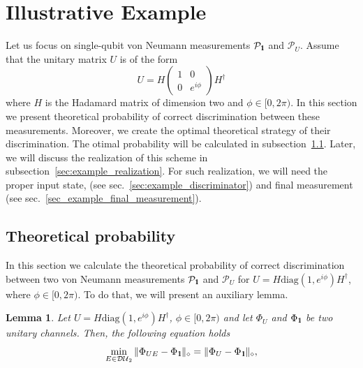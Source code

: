 \documentclass[preprint,12pt, a4paper]{elsarticle}
\newcommand{\1}{{\rm 1\hspace{-0.9mm}l}}
\newcommand{\Id}{{\rm 1\hspace{-0.9mm}l}}
\newcommand{\ee}{\ensuremath{\mathrm{e}}}
\newcommand{\ii}{\ensuremath{\mathrm{i}}}
\newcommand{\PP}{\mathcal{P}}
\newcommand{\diaguni}{\ensuremath{\mathcal{DU}}}
\newcommand{\diag}{\mathrm{diag}}
\newtheorem{lemma}{Lemma}
\begin{document}
\section{Illustrative Example}

Let us focus on single-qubit von Neumann measurements $\PP_\1$ and $\PP_U$.
Assume that the unitary matrix $U$ is of the form 
\begin{equation}
U = H 
\left(\begin{array}{cc}1&0\\0&e^{i \phi}\end{array}\right)  H^\dagger
\end{equation}
where $H$ is the Hadamard matrix of dimension two and $\phi \in [0, 2 \pi)$.
In this section we present theoretical probability of correct 
discrimination between these measurements. Moreover, we create the optimal 
theoretical strategy of their discrimination. 
The otimal probability will be calculated in 
subsection~\ref{sec:example_theoretical_probability}. Later, we will 
discuss the realization of this scheme in 
subsection~\ref{sec:example_realization}. For such realization, we 
will need the proper input state, (see sec.~\ref{sec:example_discriminator}) 
and final measurement (see sec.~\ref{sec_example_final_measurement}). 

\subsection{Theoretical probability}\label{sec:example_theoretical_probability}

In this section we calculate the theoretical probability of correct discrimination between two von Neumann measurements $\PP_\1$ and $\PP_U$ for $U = H \diag(1, e^{i \phi}) H^\dagger$, where  $\phi \in [0, 2\pi)$.  To do that, we will present an auxiliary lemma.   
\begin{lemma}\label{lemma:min-e-optimal}
Let $U = H \diag(1, e^{i \phi}) H^\dagger$, $\phi \in [0, 2\pi)$ and	let 
$\Phi_U$ and $\Phi_\Id$ be two unitary channels. Then, the following equation holds 
\begin{equation}
\min_{E \in \diaguni_2} \|\Phi_{UE} - 
\Phi_\Id\|_\diamond = \|\Phi_{U} - 
\Phi_\Id\|_\diamond,
\end{equation}
\end{lemma}
\end{document}
